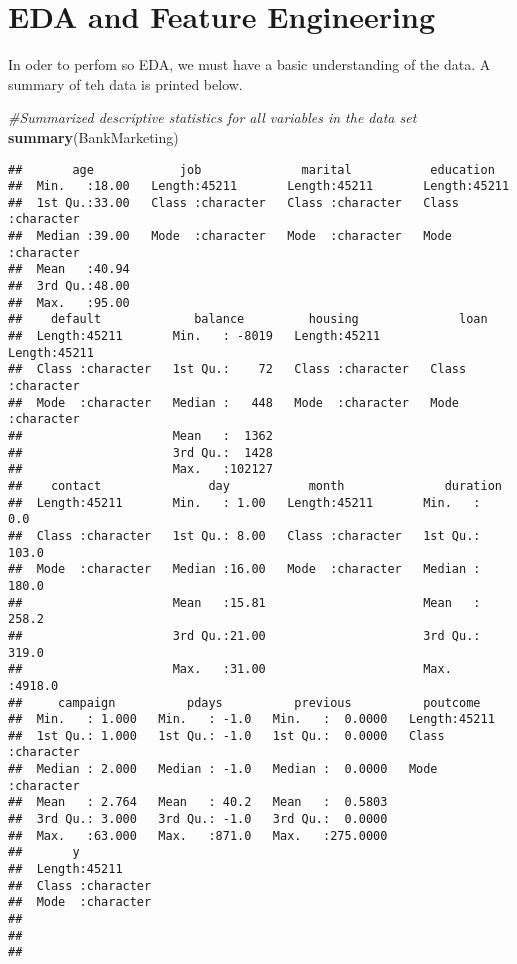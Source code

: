 \documentclass[
]{article}
\newenvironment{Shaded}{\begin{snugshade}}{\end{snugshade}}
\newcommand{\CommentTok}[1]{\textcolor[rgb]{0.56,0.35,0.01}{\textit{#1}}}
\newcommand{\FunctionTok}[1]{\textcolor[rgb]{0.13,0.29,0.53}{\textbf{#1}}}
\newcommand{\NormalTok}[1]{#1}
\begin{document}
\section{EDA and Feature Engineering}\label{eda-and-feature-engineering}

In oder to perfom so EDA, we must have a basic understanding of the
data. A summary of teh data is printed below.

\begin{Shaded}
\begin{Highlighting}[]
\CommentTok{\#Summarized descriptive statistics for all variables in the data set}
\FunctionTok{summary}\NormalTok{(BankMarketing)}
\end{Highlighting}
\end{Shaded}

\begin{verbatim}
##       age            job              marital           education        
##  Min.   :18.00   Length:45211       Length:45211       Length:45211      
##  1st Qu.:33.00   Class :character   Class :character   Class :character  
##  Median :39.00   Mode  :character   Mode  :character   Mode  :character  
##  Mean   :40.94                                                           
##  3rd Qu.:48.00                                                           
##  Max.   :95.00                                                           
##    default             balance         housing              loan          
##  Length:45211       Min.   : -8019   Length:45211       Length:45211      
##  Class :character   1st Qu.:    72   Class :character   Class :character  
##  Mode  :character   Median :   448   Mode  :character   Mode  :character  
##                     Mean   :  1362                                        
##                     3rd Qu.:  1428                                        
##                     Max.   :102127                                        
##    contact               day           month              duration     
##  Length:45211       Min.   : 1.00   Length:45211       Min.   :   0.0  
##  Class :character   1st Qu.: 8.00   Class :character   1st Qu.: 103.0  
##  Mode  :character   Median :16.00   Mode  :character   Median : 180.0  
##                     Mean   :15.81                      Mean   : 258.2  
##                     3rd Qu.:21.00                      3rd Qu.: 319.0  
##                     Max.   :31.00                      Max.   :4918.0  
##     campaign          pdays          previous          poutcome        
##  Min.   : 1.000   Min.   : -1.0   Min.   :  0.0000   Length:45211      
##  1st Qu.: 1.000   1st Qu.: -1.0   1st Qu.:  0.0000   Class :character  
##  Median : 2.000   Median : -1.0   Median :  0.0000   Mode  :character  
##  Mean   : 2.764   Mean   : 40.2   Mean   :  0.5803                     
##  3rd Qu.: 3.000   3rd Qu.: -1.0   3rd Qu.:  0.0000                     
##  Max.   :63.000   Max.   :871.0   Max.   :275.0000                     
##       y            
##  Length:45211      
##  Class :character  
##  Mode  :character  
##                    
##                    
## 
\end{verbatim}
\end{document}
